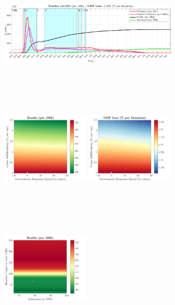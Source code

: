 \documentclass[paper=a4, fontsize=11pt]{scrartcl}
\numberwithin{figure}{section}
\numberwithin{table}{section}
\begin{document}
\begin{figure}[H]
\centering
    \begin{subfigure}[b]{\textwidth}
     	\includegraphics[width=\textwidth,height=5.5cm]{Counterfactuals/CN_cv19}
    \end{subfigure}
    \begin{subfigure}[b]{\textwidth}
      	\includegraphics[width=0.49\textwidth,height=6cm]{CN/COVID/ero_d}
	\hspace{0.05cm}
    	\includegraphics[width=0.49\textwidth,height=6cm]{CN/COVID/ero_g}
    \end{subfigure}
    \begin{subfigure}[b]{\textwidth}
      	\includegraphics[width=0.49\textwidth,height=6cm]{CN/COVID/npl_d}

\end{subfigure}
\end{figure}
\end{document}
